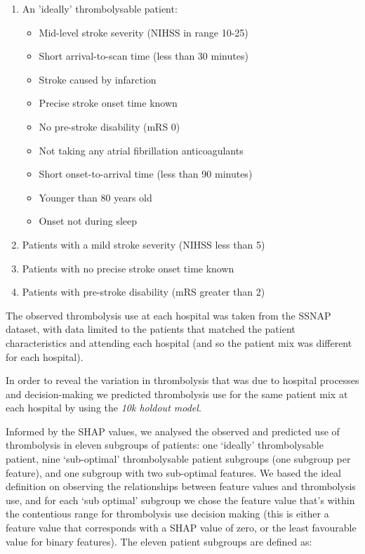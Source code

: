 \begin{enumerate}
  \item An 'ideally' thrombolysable patient:
  \begin{itemize}
    \item Mid-level stroke severity (NIHSS in range 10-25)
    \item Short arrival-to-scan time (less than 30 minutes)
    \item Stroke caused by infarction
    \item Precise stroke onset time known
    \item No pre-stroke disability (mRS 0)
    \item Not taking any atrial fibrillation anticoagulants
    \item Short onset-to-arrival time (less than 90 minutes)
    \item Younger than 80 years old
    \item Onset not during sleep
  \end{itemize}
  \item Patients with a mild stroke severity (NIHSS less than 5)
  \item Patients with no precise stroke onset time known
  \item Patients with pre-stroke disability (mRS greater than 2)
\end{enumerate}

The observed thrombolysis use at each hospital was taken from the SSNAP dataset, with data limited to the patients that matched the patient characteristics and attending each hospital (and so the patient mix was different for each hospital).

In order to reveal the variation in thrombolysis that was due to hospital processes and decision-making we predicted thrombolysis use for the same patient mix at each hospital by using the \emph{10k holdout model}.
\fi

Informed by the SHAP values, we analysed the observed and predicted use of thrombolysis in eleven subgroups of patients: one `ideally' thrombolysable patient, nine `sub-optimal' thrombolysable patient subgroups (one subgroup per feature), and one subgroup with two sub-optimal features. We based the ideal definition on observing the relationships between feature values and thrombolysis use, and for each `sub optimal' subgroup we chose the feature value that's within the contentious range for thrombolysis use decision making (this is either a feature value that corresponds with a SHAP value of zero, or the least favourable value for binary features). The eleven patient subgroups are defined as:

